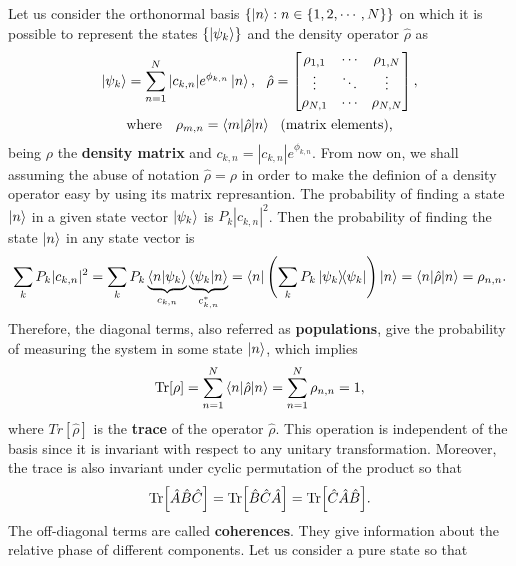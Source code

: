 Let us consider the orthonormal basis $ \{\ket{n} : n \in \{1, 2, \cdots, N\}\} $ on which it is possible to represent the states $ \{\ket{\psi_k}\} $ and the density operator $ \hat{\rho} $ as
\begin{gather}
	\ket{\psi_k} = \sum_{n = 1}^{N} |c_{k,n}|e^{\phi_{k,n}} \ket{n},\ \
	\hat{\rho} = \left[
	\begin{matrix}
		\rho_{1,1} & \cdots & \rho_{1,N} \\
		\vdots & \ddots & \vdots \\
		\rho_{N,1} & \cdots & \rho_{N,N}
	\end{matrix} \right], \\
	\textrm{where}\ \ \ \rho_{m,n} = \braket{m|\hat{\rho}|n}\ \ \textrm{(matrix elements),}
\end{gather}
being $ \rho $ the \textbf{density matrix} and $ c_{k,n} = |c_{k,n}|e^{\phi_{k,n}} $. From now on, we shall assuming the abuse of notation $ \hat{\rho} = \rho $ in order to make the definion of a density operator easy by using its matrix represantion. The probability of finding a state $ \ket{n} $ in a given state vector $ \ket{\psi_k} $ is $ P_k |c_{k,n}|^2 $. Then the probability of finding the state $ \ket{n} $ in any state vector is
\begin{equation}
	\sum_{k} P_k |c_{k,n}|^2 = \sum_{k} P_k \underbrace{\braket{n|\psi_k}}_{c_{k,n}}\underbrace{\braket{\psi_k|n}}_{c_{k,n}^*} = \bra{n} \left( \sum_k P_k \ketbra{\psi_k}{\psi_k} \right) \ket{n} = \braket{n|\hat{\rho}|n} = \rho_{n,n}.
\end{equation}
Therefore, the diagonal terms, also referred as \textbf{populations}, give the probability of measuring the system in some state $ \ket{n} $, which implies
\begin{equation}
	\Tr[\rho] = \sum_{n = 1}^{N} \braket{n|\hat{\rho}|n} = \sum_{n = 1}^{N} \rho_{n,n} = 1,
\end{equation}
where $ Tr[\hat{\rho}] $ is the \textbf{trace} of the operator $ \hat{\rho} $. This operation is independent of the basis since it is invariant with respect to any unitary transformation. Moreover, the trace is also invariant under cyclic permutation of the product so that
\begin{equation}
	\Tr[\hat{A}\hat{B}\hat{C}] = \Tr[\hat{B}\hat{C}\hat{A}] = \Tr[\hat{C}\hat{A}\hat{B}].
\end{equation}
The off-diagonal terms are called \textbf{coherences}. They give information about the relative phase of different components. Let us consider a pure state so that

